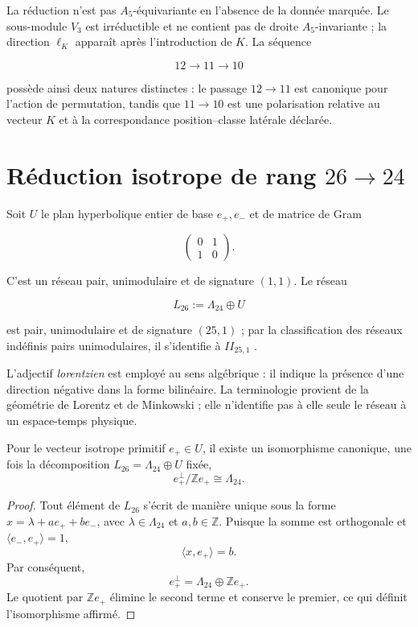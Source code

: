 La réduction n'est pas \(A_5\)-équivariante en l'absence de la donnée marquée. Le
sous-module \(V_3\) est irréductible et ne contient pas de droite \(A_5\)-invariante ;
la direction \(\ell_K\) apparaît après l'introduction de \(K\). La séquence

\[
12\longrightarrow11\longrightarrow10
\]

possède ainsi deux natures distinctes : le passage \(12\to11\) est canonique pour
l'action de permutation, tandis que \(11\to10\) est une polarisation
relative au vecteur \(K\) et à la correspondance position--classe latérale déclarée.

\section{Réduction isotrope de rang \(26\to24\)}
\label{sec:reduccion-26-24}

Soit \(U\) le plan hyperbolique entier de base \(e_+,e_-\) et de matrice de Gram

\[
\begin{pmatrix}0&1\\1&0\end{pmatrix}.
\]

C'est un réseau pair, unimodulaire et de signature \((1,1)\). Le réseau

\[
L_{26}:=\Lambda_{24}\oplus U
\]

est pair, unimodulaire et de signature \((25,1)\) ; par la classification des réseaux
indéfinis pairs unimodulaires, il s'identifie à \(II_{25,1}\)
\cite{ConwaySloane1999}.

L'adjectif \emph{lorentzien} est employé au sens algébrique : il indique la
présence d'une direction négative dans la forme bilinéaire. La terminologie
provient de la géométrie de Lorentz et de Minkowski
\cite{Lorentz1904,Minkowski1909} ; elle n'identifie pas à elle seule le réseau à
un espace-temps physique.

\begin{theorem}
\label{thm:reduccion-nula}
Pour le vecteur isotrope primitif \(e_+\in U\), il existe un isomorphisme
canonique, une fois la décomposition \(L_{26}=\Lambda_{24}\oplus U\) fixée,
\[
e_+^\perp/\mathbb Ze_+\cong\Lambda_{24}.
\]
\end{theorem}

\begin{proof}
Tout élément de \(L_{26}\) s'écrit de manière unique sous la forme
\(x=\lambda+ae_++be_-\), avec
\(\lambda\in\Lambda_{24}\) et \(a,b\in\mathbb Z\). Puisque la somme est
orthogonale et \(\langle e_-,e_+\rangle=1\),
\[
\langle x,e_+\rangle=b.
\]
Par conséquent,
\[
e_+^\perp=\Lambda_{24}\oplus\mathbb Ze_+.
\]
Le quotient par \(\mathbb Ze_+\) élimine le second terme et conserve le
premier, ce qui définit l'isomorphisme affirmé.
\end{proof}

